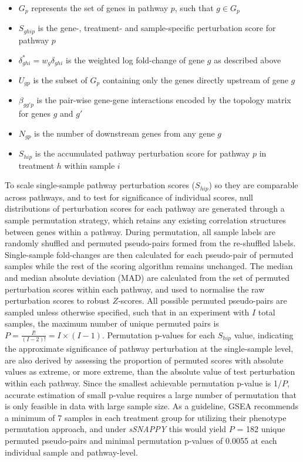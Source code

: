 \documentclass[9pt,a4paper,]{extarticle}
\begin{document}
\begin{itemize}
\item
  \(G_p\) represents the set of genes in pathway \(p\), such that \(g \in G_p\)
\item
  \(S_{ghip}\) is the gene-, treatment- and sample-specific perturbation score for pathway \(p\)
\item
  \(\delta_{ghi}^* = w_g\delta_{ghi}\) is the weighted log fold-change of gene \(g\) as described above
\item
  \(U_{gp}\) is the subset of \(G_p\) containing only the genes directly upstream of gene \(g\)
\item
  \(\beta_{gg'p}\) is the pair-wise gene-gene interactions\citep{Tarca2009} encoded by the topology matrix for genes \(g\) and \(g'\)
\item
  \(N_{gp}\) is the number of downstream genes from any gene \(g\)
\item
  \(S_{hip}\) is the accumulated pathway perturbation score for pathway \(p\) in treatment \(h\) within sample \(i\)
\end{itemize}

To scale single-sample pathway perturbation scores (\(S_{hip}\)) so they are comparable across pathways, and to test for significance of individual scores, null distributions of perturbation scores for each pathway are generated through a sample permutation strategy, which retains any existing correlation structures between genes within a pathway.
During permutation, all sample labels are randomly shuffled and permuted pseudo-pairs formed from the re-shuffled labels.
Single-sample fold-changes are then calculated for each pseudo-pair of permuted samples while the rest of the scoring algorithm remains unchanged.
The median and median absolute deviation (MAD) are calculated from the set of permuted perturbation scores within each pathway, and used to normalise the raw perturbation scores to robust \(Z\)-scores.
All possible permuted pseudo-pairs are sampled unless otherwise specified, such that in an experiment with \(I\) total samples, the maximum number of unique permuted pairs is \(P = \frac{{I!}}{{(I-2)!}} = I \times (I-1)\).
Permutation p-values for each \(S_{hip}\) value, indicating the approximate significance of pathway perturbation at the single-sample level, are also derived by assessing the proportion of permuted scores with absolute values as extreme, or more extreme, than the absolute value of test perturbation within each pathway\citep{Theo2009}.
Since the smallest achievable permutation p-value is 1/\(P\), accurate estimation of small p-value requires a large number of permutation that is only feasible in data with large sample size.
As a guideline, GSEA recommends a minimum of 7 samples in each treatment group for utilizing their phenotype permutation approach\citep{GSEAUserGuide}, and under \emph{sSNAPPY} this would yield \(P\) = 182 unique permuted pseudo-pairs and minimal permutation p-values of 0.0055 at each individual sample and pathway-level.
\end{document}
